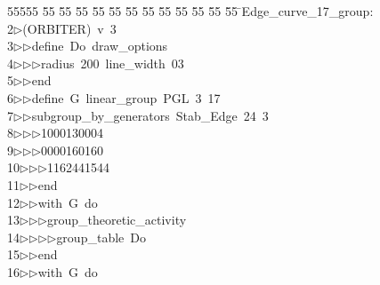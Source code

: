 %
%
\begin{tabbing}
55555 \= 55 \= 55 \= 55 \= 55 \= 55 \= 55 \= 55 \= 55 \= 55 \= 55 \= 55 \= 55 \= \>Edge\_curve\_17\_group:\\[0pt]
2\>$\triangleright$\>(ORBITER)\ v\ 3\ \\[0pt]
3\>$\triangleright$\>$\triangleright$\>define\ Do\ draw\_options\ \\[0pt]
4\>$\triangleright$\>$\triangleright$\>$\triangleright$\>radius\ 200\ line\_width\ 03\ \\[0pt]
5\>$\triangleright$\>$\triangleright$\>end\ \\[0pt]
6\>$\triangleright$\>$\triangleright$\>define\ G\ linear\_group\ PGL\ 3\ 17\ \\[0pt]
7\>$\triangleright$\>$\triangleright$\>subgroup\_by\_generators\ Stab\_Edge\ 24\ 3\ \\[0pt]
8\>$\triangleright$\>$\triangleright$\>$\triangleright$\>1000130004\ \\[0pt]
9\>$\triangleright$\>$\triangleright$\>$\triangleright$0000160160\ \\[0pt]
10\>$\triangleright$\>$\triangleright$\>$\triangleright$1162441544\ \\[0pt]
11\>$\triangleright$\>$\triangleright$\>end\ \\[0pt]
12\>$\triangleright$\>$\triangleright$\>with\ G\ do\ \\[0pt]
13\>$\triangleright$\>$\triangleright$\>$\triangleright$\>group\_theoretic\_activity\ \\[0pt]
14\>$\triangleright$\>$\triangleright$\>$\triangleright$\>$\triangleright$\>group\_table\ Do\ \\[0pt]
15\>$\triangleright$\>$\triangleright$\>end\ \\[0pt]
16\>$\triangleright$\>$\triangleright$\>with\ G\ do\ \\[0pt]

\end{tabbing}
